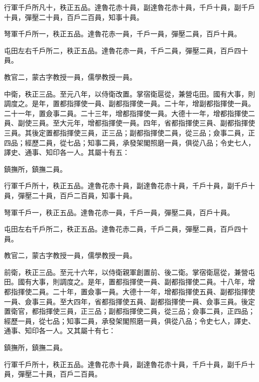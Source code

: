\begin{pinyinscope}
 行軍千戶所凡十，秩正五品。達魯花赤十員，副達魯花赤十員，千戶十員，副千戶十員，彈壓二十員，百戶二百員，知事十員。



 弩軍千戶所一，秩正五品。達魯花赤一員，千戶一員，彈壓二員，百戶十員。



 屯田左右千戶所二，秩正五品。達魯花赤一員，千戶二員，彈壓二員，百戶四十員。



 教官二，蒙古字教授一員，儒學教授一員。



 中衛，秩正三品。至元八年，以侍衛改置。掌宿衛扈從，兼營屯田。國有大事，則調度之。是年，置都指揮使一員、副都指揮使一員。二十年，增副都指揮使一員。二十一年，置僉事二員。二十三年，增都指揮使一員。大德十一年，增都指揮使二員、副使三員。至大元年，增都指揮使一員。四年，省都指揮使三員、副都指揮使三員。其後定置都指揮使三員，正三品；副都指揮使二員，從三品；僉事二員，正四品；經歷二員，從七品；知事二員，承發架閣照磨一員，俱從八品；令史七人，譯史、通事、知印各一人。其屬十有五：



 鎮撫所，鎮撫二員。



 行軍千戶所十，秩正五品。達魯花赤十員，副達魯花赤十員，千戶十員，副千戶十員，彈壓二十員，百戶二百員，知事十員。



 弩軍千戶一，秩正五品。達魯花赤一員，千戶一員，彈壓二員，百戶十員。



 屯田左右千戶所二，秩正五品。達魯花赤二員，千戶二員，彈壓二員，百戶四十員。



 教官二，蒙古字教授一員，儒學教授一員。



 前衛，秩正三品。至元十六年，以侍衛親軍創置前、後二衛。掌宿衛扈從，兼營屯田。國有大事，則調度之。是年，置都指揮使一員、副都指揮使二員。十八年，增都指揮使二員。二十年，置僉事一員。大德十一年，增都指揮使五員、副都指揮使一員、僉事三員。至大四年，省都指揮使五員、副都指揮使一員、僉事三員。後定置衛官，都指揮使三員，正三品；副都指揮使二員，從三品；僉事二員，正四品；經歷一員，從七品；知事二員，承發架閣照磨一員，俱從八品；令史七人，譯史、通事、知印各一人。又其屬十有七：



 鎮撫所，鎮撫二員。



 行軍千戶所十，秩正五品。達魯花赤十員，副達魯花赤十員，千戶十員，副千戶十員，彈壓二十員，百戶二百員。




\end{pinyinscope}
